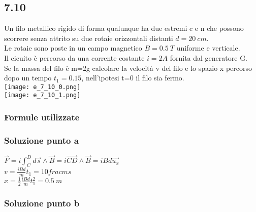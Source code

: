 \documentclass[../../main.tex]{subfiles}
\begin{document}
\subsection*{7.10}
Un filo metallico rigido di forma qualunque ha due estremi c e n che possono scorrere senza attrito su due rotaie orizzontali distanti $d = 20\ cm$.
\\Le rotaie sono poste in un campo magnetico $B = 0.5\ T$ uniforme e verticale.
\\Il cicuito è percorso da una corrente costante $i = 2A$ fornita dal generatore G.
\\Se la massa del filo è m=2g calcolare la velocità v del filo e lo spazio x percorso dopo un tempo $t_1 = 0.15$, nell'ipotesi t=0 il filo sia fermo.
\\\texttt{[image: e\_7\_10\_0.png]}
\\\texttt{[image: e\_7\_10\_1.png]}
\subsubsection*{Formule utilizzate}
\subsubsection*{Soluzione punto a}
$\vec{F} = i\int_C^D d\vec{s}\wedge\vec{B} = i\vec{CD}\wedge\vec{B} = iBd\vec{u_x}$
\\$v= \frac{iBd}{m}t_1 = 10 frac{m}{s}$
\\$x=\frac{1}{2}\frac{iBd}{m}t_1^2=0.5\ m$
\subsubsection*{Soluzione punto b}
\newpage
\end{document}
